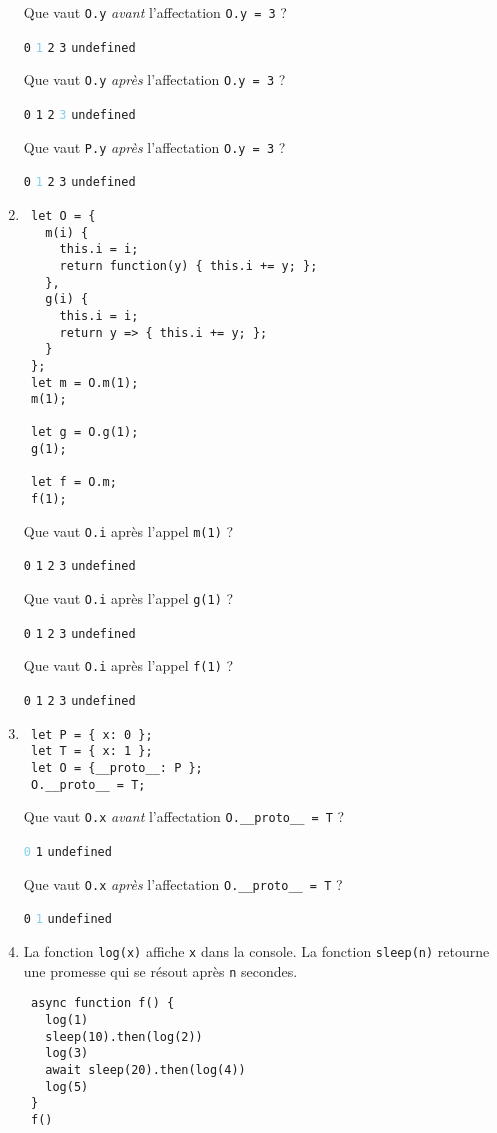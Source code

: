 \documentclass[a4paper, 12pt]{article}
\newcommand{\choicec}[1]{\Square\hspace{2pt} \lstinline{#1}\hspace{5pt}}
\newcommand{\fullpoint}[1]{\textcolor{RubineRed}{#1}}
\newcommand{\halfpoint}[1]{\textcolor{SkyBlue}{#1}}
\newcommand{\choicecg}[1]{\fullpoint{\XBox\hspace{2pt} \lstinline{#1}\hspace{5pt}}}
\newcommand{\choicecgh}[1]{\halfpoint{\XBox\hspace{2pt} \lstinline{#1}\hspace{5pt}}}
\begin{document}
\begin{enumerate}
  Que vaut \lstinline{O.y} \emph{avant} l'affectation \lstinline{O.y = 3} ?

  \choicec{0} \choicecgh{1} \choicec{2} \choicec{3} \choicec{undefined}

  Que vaut \lstinline{O.y} \emph{après} l'affectation \lstinline{O.y = 3} ?

  \choicec{0} \choicec{1} \choicec{2} \choicecgh{3} \choicec{undefined}

  Que vaut \lstinline{P.y} \emph{après} l'affectation \lstinline{O.y = 3} ?

  \choicec{0} \choicecgh{1} \choicec{2} \choicec{3} \choicec{undefined}
\item \begin{lstlisting}
 let O = {
   m(i) {
     this.i = i;
     return function(y) { this.i += y; };
   },
   g(i) {
     this.i = i;
     return y => { this.i += y; };
   }
 };
 let m = O.m(1);
 m(1);

 let g = O.g(1);
 g(1);

 let f = O.m;
 f(1);
\end{lstlisting}

  Que vaut \lstinline{O.i} après l'appel \lstinline{m(1)} ?

  \choicec{0} \choicecg{1} \choicec{2} \choicec{3} \choicec{undefined}

  Que vaut \lstinline{O.i} après l'appel \lstinline{g(1)} ?

  \choicec{0} \choicec{1} \choicecg{2} \choicec{3} \choicec{undefined}

  Que vaut \lstinline{O.i} après l'appel \lstinline{f(1)} ?

  \choicec{0} \choicec{1} \choicecg{2} \choicec{3} \choicec{undefined}
\item \begin{lstlisting}
 let P = { x: 0 };
 let T = { x: 1 };
 let O = {__proto__: P };
 O.__proto__ = T;
\end{lstlisting}

  Que vaut \lstinline{O.x} \emph{avant} l'affectation \lstinline{O.__proto__ = T} ?

  \choicecgh{0} \choicec{1} \choicec{undefined}

  Que vaut \lstinline{O.x} \emph{après} l'affectation \lstinline{O.__proto__ = T} ?

  \choicec{0} \choicecgh{1} \choicec{undefined}
\item La fonction \lstinline{log(x)} affiche \lstinline{x} dans la console.  La
  fonction \lstinline{sleep(n)} retourne une promesse qui se résout après
  \lstinline{n} secondes.
  \begin{lstlisting}
 async function f() {
   log(1)
   sleep(10).then(log(2))
   log(3)
   await sleep(20).then(log(4))
   log(5)
 }
 f()
\end{lstlisting}


\end{enumerate}
\end{document}
